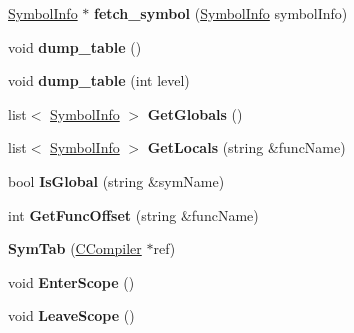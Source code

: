 \begin{DoxyCompactItemize}
\item 
\hypertarget{classSymTab_aa977139826a1cdf093078e0527ed1ab3}{\hyperlink{structSymbolInfo}{Symbol\-Info} $\ast$ {\bfseries fetch\-\_\-symbol} (\hyperlink{structSymbolInfo}{Symbol\-Info} symbol\-Info)}\label{classSymTab_aa977139826a1cdf093078e0527ed1ab3}

\item 
\hypertarget{classSymTab_ab4c005eb114053be22fdbe315542f55b}{void {\bfseries dump\-\_\-table} ()}\label{classSymTab_ab4c005eb114053be22fdbe315542f55b}

\item 
\hypertarget{classSymTab_ad5d45136f341bf024a226fe600fb4dcc}{void {\bfseries dump\-\_\-table} (int level)}\label{classSymTab_ad5d45136f341bf024a226fe600fb4dcc}

\item 
\hypertarget{classSymTab_aced837e720830dd9ccb2d3dde621d489}{list$<$ \hyperlink{structSymbolInfo}{Symbol\-Info} $>$ {\bfseries Get\-Globals} ()}\label{classSymTab_aced837e720830dd9ccb2d3dde621d489}

\item 
\hypertarget{classSymTab_a76b5a70170535019b1fe58fa25a9998c}{list$<$ \hyperlink{structSymbolInfo}{Symbol\-Info} $>$ {\bfseries Get\-Locals} (string \&func\-Name)}\label{classSymTab_a76b5a70170535019b1fe58fa25a9998c}

\item 
\hypertarget{classSymTab_a4c4699d90ffd605b205e9e94be9eacde}{bool {\bfseries Is\-Global} (string \&sym\-Name)}\label{classSymTab_a4c4699d90ffd605b205e9e94be9eacde}

\item 
\hypertarget{classSymTab_a793c31d247f484b04a9283e71f172756}{int {\bfseries Get\-Func\-Offset} (string \&func\-Name)}\label{classSymTab_a793c31d247f484b04a9283e71f172756}

\item 
\hypertarget{classSymTab_a20c7b65c7ffb728fa792e87258d381a2}{{\bfseries Sym\-Tab} (\hyperlink{classCCompiler}{C\-Compiler} $\ast$ref)}\label{classSymTab_a20c7b65c7ffb728fa792e87258d381a2}

\item 
\hypertarget{classSymTab_af335dd1ba840dfab4219856545d5d8ef}{void {\bfseries Enter\-Scope} ()}\label{classSymTab_af335dd1ba840dfab4219856545d5d8ef}

\item 
\hypertarget{classSymTab_afd2c44208cdad3ddfc85136136cd27c3}{void {\bfseries Leave\-Scope} ()}\label{classSymTab_afd2c44208cdad3ddfc85136136cd27c3}


\end{DoxyCompactItemize}
